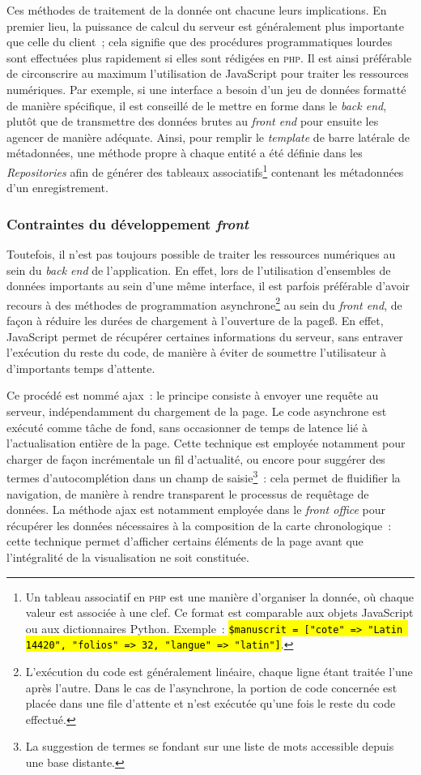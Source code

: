 \documentclass[a4paper,12pt,twoside]{book}
\let\OldTexttt\texttt
\renewcommand{\texttt}[1]{\OldTexttt{\hl{#1}}}
\newcommand{\eng}{\emph}
\newcommand{\php}{\textsc{php}\xspace}
\newcommand{\fo}{\eng{front office}\xspace}
\newcommand{\ajax}{\gls{ajax}\xspace}
\begin{document}
Ces méthodes de traitement de la donnée ont chacune leurs implications. En premier lieu, la puissance de calcul du serveur est généralement plus importante que celle du client~; cela signifie que des procédures programmatiques lourdes sont effectuées plus rapidement si elles sont rédigées en \php. Il est ainsi préférable de circonscrire au maximum l'utilisation de JavaScript pour traiter les ressources numériques. Par exemple, si une interface a besoin d'un jeu de données formatté de manière spécifique, il est conseillé de le mettre en forme dans le \eng{back end}, plutôt que de transmettre des données brutes au \eng{front end} pour ensuite les agencer de manière adéquate. Ainsi, pour remplir le \eng{template} de barre latérale de métadonnées, une méthode propre à chaque entité a été définie dans les \eng{Repositories} afin de générer des tableaux associatifs\footnote{Un tableau associatif en \php est une manière d'organiser la donnée, où chaque valeur est associée à une clef. Ce format est comparable aux objets JavaScript ou aux dictionnaires Python. \newline Exemple~: \texttt{\$manuscrit = ["cote" => "Latin 14420", "folios" => 32, "langue" => "latin"]}.} contenant les métadonnées d'un enregistrement.

			\subsubsection{Contraintes du développement \eng{front}}
Toutefois, il n'est pas toujours possible de traiter les ressources numériques au sein du \eng{back end} de l'application. En effet, lors de l'utilisation d'ensembles de données importants au sein d'une même interface, il est parfois préférable d'avoir recours à des méthodes de programmation asynchrone\footnote{L'exécution du code est généralement linéaire, chaque ligne étant traitée l'une après l'autre. Dans le cas de l'asynchrone, la portion de code concernée est placée dans une file d'attente et n'est exécutée qu'une fois le reste du code effectué.} au sein du \eng{front end}, de façon à réduire les durées de chargement à l'ouverture de la pageß. En effet, JavaScript permet de récupérer certaines informations du serveur, sans entraver l'exécution du reste du code, de manière à éviter de soumettre l'utilisateur à d'importants temps d'attente.

Ce procédé est nommé \ajax~: le principe consiste à envoyer une requête au serveur, indépendamment du chargement de la page. Le code asynchrone est exécuté comme tâche de fond, sans occasionner de temps de latence lié à l'actualisation entière de la page. Cette technique est employée notamment pour charger de façon incrémentale un fil d'actualité, ou encore pour suggérer des termes d'autocomplétion dans un champ de saisie\footnote{La suggestion de termes se fondant sur une liste de mots accessible depuis une base distante.}~: cela permet de fluidifier la navigation, de manière à rendre transparent le processus de requêtage de données. La méthode \ajax est notamment employée dans le \fo pour récupérer les données nécessaires à la composition de la carte chronologique~: cette technique permet d'afficher certains éléments de la page avant que l'intégralité de la visualisation ne soit constituée.
\end{document}
